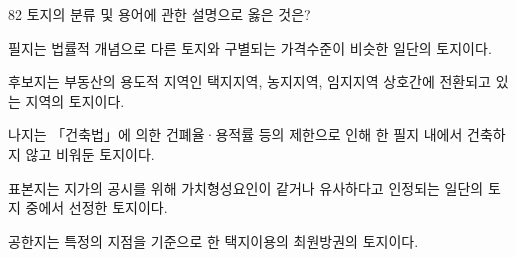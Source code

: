 \begin{question}{82}
토지의 분류 및 용어에 관한 설명으로 옳은 것은?
\begin{choices}
  \item 필지는 법률적 개념으로 다른 토지와 구별되는 가격수준이 비슷한 일단의 토지이다.
  \item 후보지는 부동산의 용도적 지역인 택지지역, 농지지역, 임지지역 상호간에 전환되고 있는 지역의 토지이다.
  \item 나지는 「건축법」에 의한 건폐율·용적률 등의 제한으로 인해 한 필지 내에서 건축하지 않고 비워둔 토지이다.
  \item 표본지는 지가의 공시를 위해 가치형성요인이 같거나 유사하다고 인정되는 일단의 토지 중에서 선정한 토지이다.
  \item 공한지는 특정의 지점을 기준으로 한 택지이용의 최원방권의 토지이다.
\end{choices}
\end{question}
